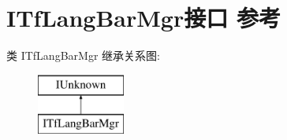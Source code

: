 \hypertarget{interface_i_tf_lang_bar_mgr}{}\section{I\+Tf\+Lang\+Bar\+Mgr接口 参考}
\label{interface_i_tf_lang_bar_mgr}
类 I\+Tf\+Lang\+Bar\+Mgr 继承关系图\+:\begin{figure}[H]
\begin{center}
\leavevmode
\includegraphics[height=2.000000cm]{interface_i_tf_lang_bar_mgr}
\end{center}
\end{figure}
